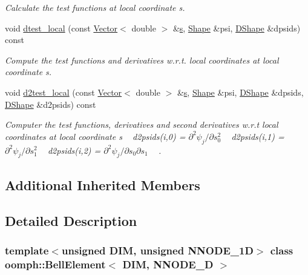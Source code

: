 \begin{DoxyCompactItemize}
\begin{DoxyCompactList}\small\item\em Calculate the test functions at local coordinate s. \end{DoxyCompactList}\item 
void \hyperlink{classoomph_1_1BellElement_ae0b6d4d44df8a05a9dd1b8709c9f0247}{dtest\+\_\+local} (const \hyperlink{classoomph_1_1Vector}{Vector}$<$ double $>$ \&\hyperlink{cfortran_8h_ab7123126e4885ef647dd9c6e3807a21c}{s}, \hyperlink{classoomph_1_1Shape}{Shape} \&psi, \hyperlink{classoomph_1_1DShape}{D\+Shape} \&dpsids) const
\begin{DoxyCompactList}\small\item\em Compute the test functions and derivatives w.\+r.\+t. local coordinates at local coordinate s. \end{DoxyCompactList}\item 
void \hyperlink{classoomph_1_1BellElement_a2d7e1df2f16e344721161ac2de099483}{d2test\+\_\+local} (const \hyperlink{classoomph_1_1Vector}{Vector}$<$ double $>$ \&\hyperlink{cfortran_8h_ab7123126e4885ef647dd9c6e3807a21c}{s}, \hyperlink{classoomph_1_1Shape}{Shape} \&psi, \hyperlink{classoomph_1_1DShape}{D\+Shape} \&dpsids, \hyperlink{classoomph_1_1DShape}{D\+Shape} \&d2psids) const
\begin{DoxyCompactList}\small\item\em Computer the test functions, derivatives and second derivatives w.\+r.\+t local coordinates at local coordinate s ~\newline
d2psids(i,0) = $ \partial^2 \psi_j / \partial s_0^2 $ ~\newline
d2psids(i,1) = $ \partial^2 \psi_j / \partial s_1^2 $ ~\newline
d2psids(i,2) = $ \partial^2 \psi_j / \partial s_0 \partial s_1 $ ~\newline
. \end{DoxyCompactList}\end{DoxyCompactItemize}
\subsection*{Additional Inherited Members}


\subsection{Detailed Description}
\subsubsection*{template$<$unsigned D\+IM, unsigned N\+N\+O\+D\+E\+\_\+1D$>$\newline
class oomph\+::\+Bell\+Element$<$ D\+I\+M, N\+N\+O\+D\+E\+\_\+D $>$}

